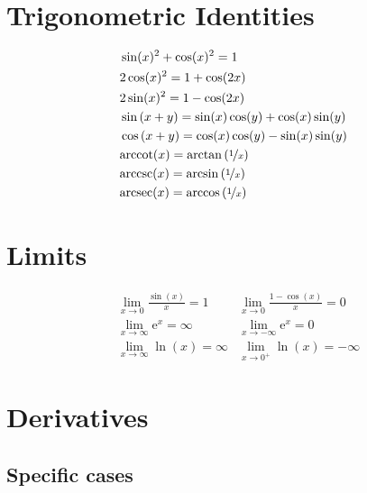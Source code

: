 \documentclass[letterpaper,9pt,fleqn]{extarticle}
\newcommand{\arcsec}{\mathrm{arcsec}}
\newcommand{\arccsc}{\mathrm{arccsc}}
\newcommand{\arccot}{\mathrm{arccot}}
\begin{document}
\begin{multicols*}{3}
\section*{Trigonometric Identities}
\vspace{-0.5in}
\begin{minipage}[c]{0.333\textwidth}
\begin{align*}
&\sin(x)^2 + \cos(x)^2 =1 \\
&2 \cos(x)^2 =  1 + \cos(2 x) \\
&2 \sin(x)^2 = 1 - \cos(2 x) \\
 &\sin\left(x +  y\right) =\sin (x) \cos (y) + \cos (x) \sin (y) \\
&\cos\left(x+y\right)=\cos (x) \cos (y) - \sin (x) \sin (y)    \\
&\arccot(x) = \arctan \left(\nicefrac{1}{x} \right) \\
&\arccsc(x) = \arcsin \left (\nicefrac{1}{x} \right) \\
&\arcsec(x) = \arccos \left (\nicefrac{1}{x} \right) 
\end{align*}
\end{minipage}
\begin{minipage}[c]{0.333\textwidth}
\section*{Limits}
\vspace{-0.4in}
\begin{align*}
 &\lim_{x \to 0}   \frac{\sin(x)}{x} = 1  & \lim_{x \to 0}   \frac{1-\cos(x)}{x} = 0 \\
 &\lim_{x \to \infty} \mathrm{e}^x = \infty & \lim_{x \to -\infty} \mathrm{e}^x = 0\\
  &\lim_{x \to \infty} \ln(x)  = \infty & \lim_{x \to 0^{+}} \ln(x)  = -\infty
 \end{align*}
\end{minipage}  
 \vspace{-0.2in}
\section*{\textbf{Derivatives}}
\vspace{-0.35in}
\subsection*{Specific cases}


\end{multicols*}
\end{document}
